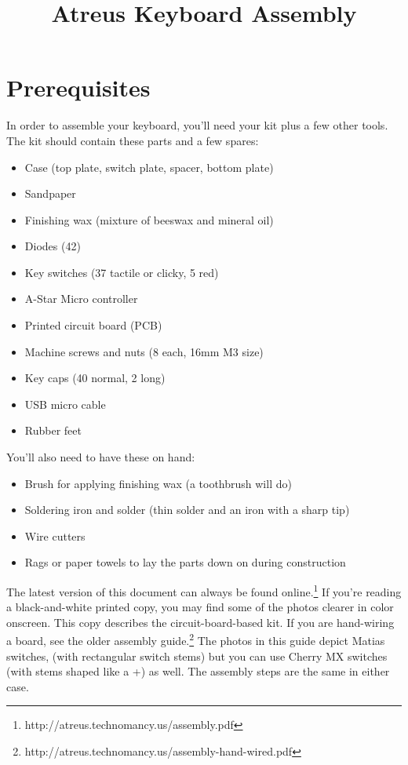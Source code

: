 \documentclass{article}
\title{Atreus Keyboard Assembly}
\date{ }
\begin{document}
\setlength{\parindent}{0cm}
\maketitle
\section{Prerequisites}

In order to assemble your keyboard, you'll need your kit plus a few
other tools. The kit should contain these parts and a few spares:

\begin{itemize}
\item Case (top plate, switch plate, spacer, bottom plate)
\item Sandpaper
\item Finishing wax (mixture of beeswax and mineral oil)
\item Diodes (42)
\item Key switches (37 tactile or clicky, 5 red)
\item A-Star Micro controller
\item Printed circuit board (PCB)
\item Machine screws and nuts (8 each, 16mm M3 size)
\item Key caps (40 normal, 2 long)
\item USB micro cable
\item Rubber feet
\end{itemize}

You'll also need to have these on hand:

\begin{itemize}
\item Brush for applying finishing wax (a toothbrush will do)
\item Soldering iron and solder (thin solder and an iron with a sharp tip)
\item Wire cutters
\item Rags or paper towels to lay the parts down on during construction
\end{itemize}

\vspace{1em}

The latest version of this document can always be found
online.\footnote{http://atreus.technomancy.us/assembly.pdf} If you're
reading a black-and-white printed copy, you may find some of the
photos clearer in color onscreen. This copy describes the
circuit-board-based kit. If you are hand-wiring a board, see the older
assembly
guide.\footnote{http://atreus.technomancy.us/assembly-hand-wired.pdf}
The photos in this guide depict Matias switches, (with rectangular
switch stems) but you can use Cherry MX switches (with stems shaped
like a +) as well. The assembly steps are the same in either case.
\end{document}
